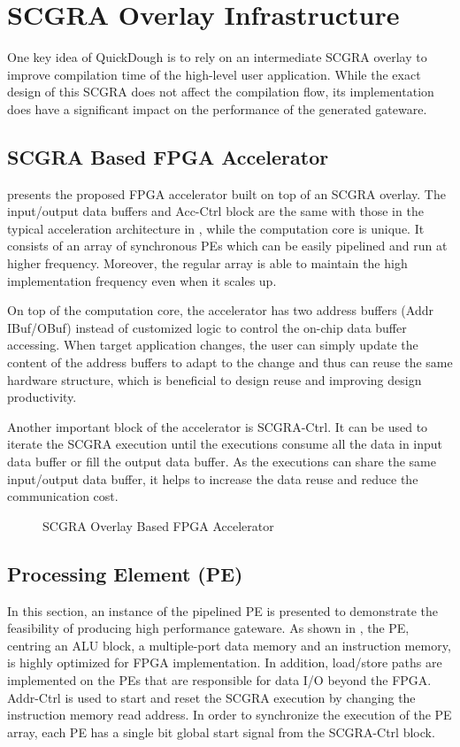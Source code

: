 \section{SCGRA Overlay Infrastructure} \label{sec:scgraimplement}
One key idea of QuickDough is to rely on an intermediate SCGRA overlay to improve compilation time of the high-level user application. While the exact design of this SCGRA does not affect the compilation flow, its implementation does have a significant impact on the performance of the generated gateware.
 
\subsection{SCGRA Based FPGA Accelerator}
 presents the proposed FPGA accelerator built on top of an SCGRA overlay. The input/output data buffers and Acc-Ctrl block are the same with those in the typical acceleration architecture in , while the computation core is unique. It consists of an array of synchronous PEs which can be easily pipelined and run at higher frequency. Moreover, the regular array is able to maintain the high implementation frequency even when it scales up.

On top of the computation core, the accelerator has two address buffers (Addr IBuf/OBuf) instead of customized logic to control the on-chip data buffer accessing. When target application changes, the user can simply update the content of the address buffers to adapt to the change and thus can reuse the same hardware structure, which is beneficial to design reuse and improving design productivity. 

Another important block of the accelerator is SCGRA-Ctrl. It can be used to iterate the SCGRA execution until the executions consume all the data in input data buffer or fill the output data buffer. As the executions can share the same input/output data buffer, it helps to increase the data reuse and reduce the communication cost. 

\begin{figure}[h]
    \caption{SCGRA Overlay Based FPGA Accelerator}
    \label{fig:scgra-accelerator}
\end{figure}

\subsection{Processing Element (PE)}
In this section, an instance of the pipelined PE is presented to demonstrate the feasibility of producing high performance gateware. As shown in , the PE, centring an ALU block, a multiple-port data memory and an instruction memory, is highly optimized for FPGA implementation. In addition, load/store paths are implemented on the PEs that are responsible for data I/O beyond the FPGA. Addr-Ctrl is used to start and reset the SCGRA execution by changing the instruction memory read address. In order to synchronize the execution of the PE array, each PE has a single bit global start signal from the SCGRA-Ctrl block. 

